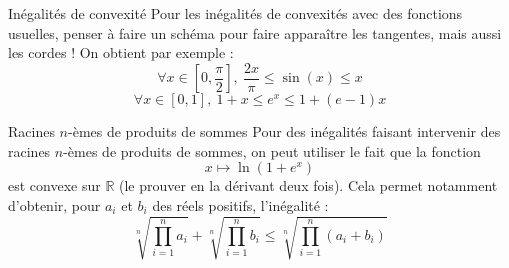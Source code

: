 \documentclass[french]{article}
\newcommand{\R}{\mathbb{R}}
\theoremstyle{theorem}
\theoremstyle{definition}
\begin{document}
\begin{lem}{Inégalités de convexité} Pour les inégalités de convexités avec des fonctions usuelles, penser à faire un schéma pour faire apparaître les tangentes, mais aussi les cordes ! On obtient par exemple : $$\forall x\in\left[0,\frac{\pi}{2}\right],\ \frac{2x}{\pi}\leqslant \sin(x)\leqslant x$$
	$$\forall x\in[0,1],\ 1+x\leqslant e^x\leqslant1+(e-1)x$$
\end{lem}

\begin{lem}{Racines $n$-èmes de produits de sommes} Pour des inégalités faisant intervenir des racines $n$-èmes de produits de sommes, on peut utiliser le fait que la fonction $$x\mapsto\ln(1+e^x)$$ est convexe sur $\R$ (le prouver en la dérivant deux fois). Cela permet notamment d'obtenir, pour $a_i$ et $b_i$ des réels positifs, l'inégalité : $$\sqrt[n]{\prod_{i=1}^{n}a_i}+\sqrt[n]{\prod_{i=1}^{n}b_i}\leqslant\sqrt[n]{\prod_{i=1}^{n}(a_i+b_i)}$$
\end{lem}
\end{document}
